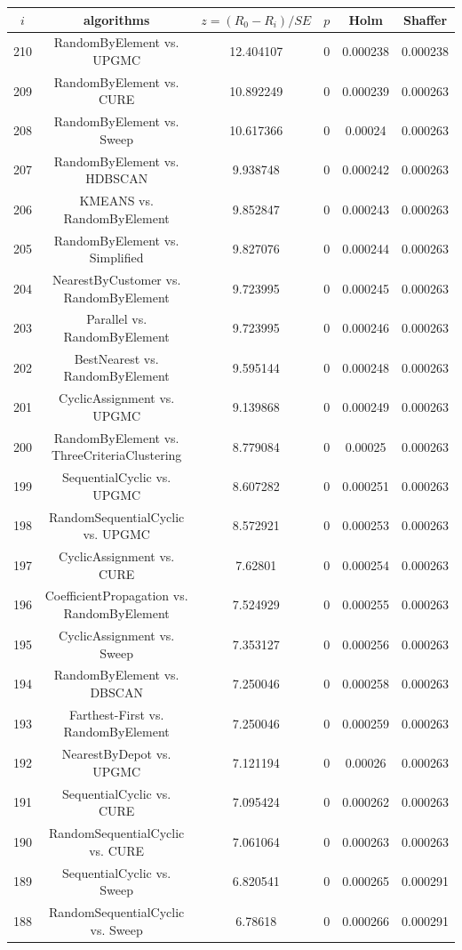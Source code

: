 \documentclass[a4paper,10pt]{article}
\begin{document}
\begin{landscape}
\begin{table}[!htp]
\centering\scriptsize
\begin{tabular}{cccccc}
$i$&algorithms&$z=(R_0 - R_i)/SE$&$p$&Holm&Shaffer\\
\hline210&RandomByElement vs. UPGMC&12.404107&0&0.000238&0.000238\\
209&RandomByElement vs. CURE&10.892249&0&0.000239&0.000263\\
208&RandomByElement vs. Sweep&10.617366&0&0.00024&0.000263\\
207&RandomByElement vs. HDBSCAN&9.938748&0&0.000242&0.000263\\
206&KMEANS vs. RandomByElement&9.852847&0&0.000243&0.000263\\
205&RandomByElement vs. Simplified&9.827076&0&0.000244&0.000263\\
204&NearestByCustomer vs. RandomByElement&9.723995&0&0.000245&0.000263\\
203&Parallel vs. RandomByElement&9.723995&0&0.000246&0.000263\\
202&BestNearest vs. RandomByElement&9.595144&0&0.000248&0.000263\\
201&CyclicAssignment vs. UPGMC&9.139868&0&0.000249&0.000263\\
200&RandomByElement vs. ThreeCriteriaClustering&8.779084&0&0.00025&0.000263\\
199&SequentialCyclic vs. UPGMC&8.607282&0&0.000251&0.000263\\
198&RandomSequentialCyclic vs. UPGMC&8.572921&0&0.000253&0.000263\\
197&CyclicAssignment vs. CURE&7.62801&0&0.000254&0.000263\\
196&CoefficientPropagation vs. RandomByElement&7.524929&0&0.000255&0.000263\\
195&CyclicAssignment vs. Sweep&7.353127&0&0.000256&0.000263\\
194&RandomByElement vs. DBSCAN&7.250046&0&0.000258&0.000263\\
193&Farthest-First vs. RandomByElement&7.250046&0&0.000259&0.000263\\
192&NearestByDepot vs. UPGMC&7.121194&0&0.00026&0.000263\\
191&SequentialCyclic vs. CURE&7.095424&0&0.000262&0.000263\\
190&RandomSequentialCyclic vs. CURE&7.061064&0&0.000263&0.000263\\
189&SequentialCyclic vs. Sweep&6.820541&0&0.000265&0.000291\\
188&RandomSequentialCyclic vs. Sweep&6.78618&0&0.000266&0.000291\\

\end{tabular}
\end{table}
\end{landscape}
\end{document}

